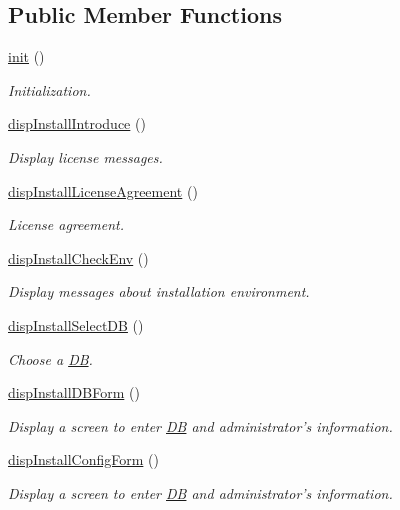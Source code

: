 \subsection*{Public Member Functions}
\begin{DoxyCompactItemize}
\item 
\hyperlink{classinstallView_ab24b18fa10e0268846ac0002d77ee453}{init} ()
\begin{DoxyCompactList}\small\item\em Initialization. \end{DoxyCompactList}\item 
\hyperlink{classinstallView_a811e5c499d36055efb16411c0f0946c1}{disp\+Install\+Introduce} ()
\begin{DoxyCompactList}\small\item\em Display license messages. \end{DoxyCompactList}\item 
\hyperlink{classinstallView_a7182430aaf7f9fb4c8e18d21e9e5a4e7}{disp\+Install\+License\+Agreement} ()
\begin{DoxyCompactList}\small\item\em License agreement. \end{DoxyCompactList}\item 
\hyperlink{classinstallView_ac73107933a9a9498aaef04380137794d}{disp\+Install\+Check\+Env} ()
\begin{DoxyCompactList}\small\item\em Display messages about installation environment. \end{DoxyCompactList}\item 
\hyperlink{classinstallView_aa3ee9747353f128111f628a5c9359c5f}{disp\+Install\+Select\+D\+B} ()
\begin{DoxyCompactList}\small\item\em Choose a \hyperlink{classDB}{D\+B}. \end{DoxyCompactList}\item 
\hyperlink{classinstallView_a61a05991e6aa8bf2278b9c438b70c8c7}{disp\+Install\+D\+B\+Form} ()
\begin{DoxyCompactList}\small\item\em Display a screen to enter \hyperlink{classDB}{D\+B} and administrator's information. \end{DoxyCompactList}\item 
\hyperlink{classinstallView_ad61c851960b71aad3b93cfd1a23149fb}{disp\+Install\+Config\+Form} ()
\begin{DoxyCompactList}\small\item\em Display a screen to enter \hyperlink{classDB}{D\+B} and administrator's information. \end{DoxyCompactList}\item 

\end{DoxyCompactItemize}
